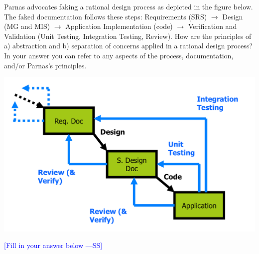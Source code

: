 \documentclass[12pt,fleqn]{examtst}
\newcommand{\authornote}[3]{\textcolor{#1}{[#3 ---#2]}}
\newcommand{\authornote}[3]{}
\newcommand{\wss}[1]{\authornote{blue}{SS}{#1}}
\begin{document}
\newpage


Parnas advocates faking a rational design process as depicted in the figure below.
The faked documentation follows these steps: Requirements (SRS) $\rightarrow$
Design (MG and MIS) $\rightarrow$ Application Implementation (code)
$\rightarrow$ Verification and Validation (Unit Testing, Integration Testing,
Review).  How are the principles of
a) abstraction and b) separation of concerns applied in a rational design
process?  In your answer you can refer to any aspects of the process,
documentation, and/or Parnas's principles.

\includegraphics[scale=0.4]{SoftwareLifecycle.png}

\noindent \wss{Fill in your answer below}
\end{document}
